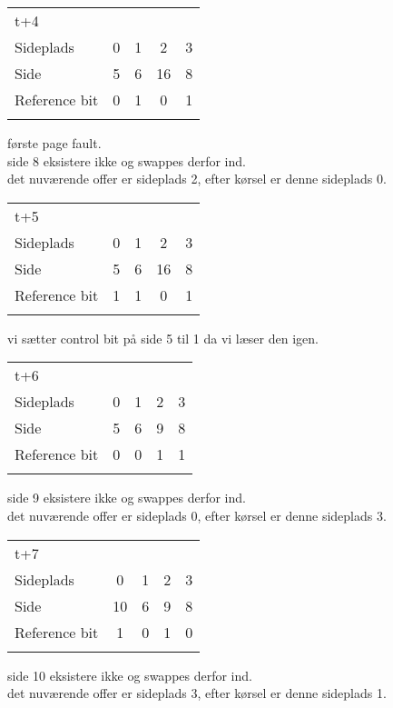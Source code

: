 \documentclass[titlepage]{article}
\begin{document}
\begin{tabular}{l | c | c | c | c}
t+4\\
Sideplads    & 0 & 1 & 2 & 3\\
Side         & 5 & 6 & 16 & 8\\
Reference bit & 0 & 1 & 0 & 1\\\\
\end{tabular}

første page fault.\\
side 8 eksistere ikke og swappes derfor ind.\\
det nuværende offer er sideplads 2, efter kørsel er denne sideplads 0.\\

\begin{tabular}{l | c | c | c | c}
t+5\\
Sideplads    & 0 & 1 & 2 & 3\\
Side         & 5 & 6 & 16 & 8\\
Reference bit & 1 & 1 & 0 & 1\\\\
\end{tabular}

vi sætter control bit på side 5 til 1 da vi læser den igen.\\

\begin{tabular}{l | c | c | c | c}
t+6\\
Sideplads    & 0 & 1 & 2 & 3\\
Side         & 5 & 6 & 9 & 8\\
Reference bit & 0 & 0 & 1 & 1\\\\
\end{tabular}

side 9 eksistere ikke og swappes derfor ind.\\
det nuværende offer er sideplads 0, efter kørsel er denne sideplads 3.\\

\begin{tabular}{l | c | c | c | c}
t+7\\
Sideplads    & 0 & 1 & 2 & 3\\
Side         & 10 & 6 & 9 & 8\\
Reference bit & 1 & 0 & 1 & 0\\\\
\end{tabular}

side 10 eksistere ikke og swappes derfor ind.\\
det nuværende offer er sideplads 3, efter kørsel er denne sideplads 1.\\
\end{document}

